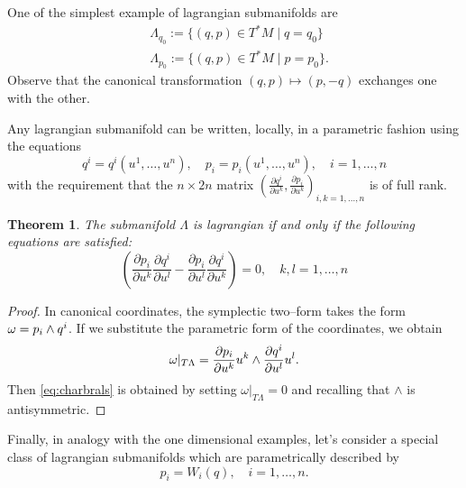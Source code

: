 \documentclass[english,fontsize=11pt,paper=a5,oneside]{scrbook}
\let\d\relax
\newcommand{\d}{\mathrm{d}}
\newtheorem{theorem}{Theorem}[chapter]
\theoremstyle{definition}
\newenvironment{example}
  {\pushQED{\qed}\renewcommand{\qedsymbol}{$\lozenge$}\examplex}
  {\popQED\endexamplex}
\begin{document}
\begin{example}
  One of the simplest example of lagrangian submanifolds are
  \begin{align}
     & \Lambda_{q_0} := \big\{(q,p)\in T^*M \mid q=q_0\big\}  \\
     & \Lambda_{p_0} := \big\{(q,p)\in T^*M \mid p=p_0\big\}.
  \end{align}
  Observe that the canonical transformation $(q,p) \mapsto (p,-q)$ exchanges one with the other.
\end{example}

Any lagrangian submanifold can be written, locally, in a parametric fashion using the equations
\begin{equation}
  q^i = q^i(u^1, \ldots, u^n), \quad p_i = p_i(u^1, \ldots, u^n), \quad i=1,\ldots,n
\end{equation}
with the requirement that the $n\times2n$ matrix $\left(\frac{\partial q^i}{\partial u^k}, \frac{\partial p_i}{\partial u^k}\right)_{i,k=1,\ldots,n}$ is of full rank.

\begin{theorem}\label{thm:charbrals}
  The submanifold $\Lambda$ is lagrangian if and only if the following equations are satisfied:
  \begin{equation}\label{eq:charbrals}
    \left(\frac{\partial p_i}{\partial u^k}\frac{\partial q^i}{\partial u^l} - \frac{\partial p_i}{\partial u^l}\frac{\partial q^i}{\partial u^k} \right) = 0,
    \quad k,l=1,\ldots,n
  \end{equation}
\end{theorem}
\begin{proof}
  In canonical coordinates, the symplectic two--form takes the form $\omega = \d p_i \wedge \d q^i$. If we substitute the parametric form of the coordinates, we obtain
  \begin{equation}
    \omega |_{T\Lambda} = \frac{\partial p_i}{\partial u^k}\d u^k \wedge \frac{\partial q^i}{\partial u^l}\d u^l.
  \end{equation}
  Then \eqref{eq:charbrals} is obtained by setting $\omega |_{T\Lambda} = 0$ and recalling that $\wedge$ is antisymmetric.
\end{proof}

Finally, in analogy with the one dimensional examples, let's consider a special class of lagrangian submanifolds which are parametrically described by
\begin{equation}\label{eq:lagsbmPofQ}
  p_i = W_i(q), \quad i=1,\ldots,n.
\end{equation}
\end{document}
